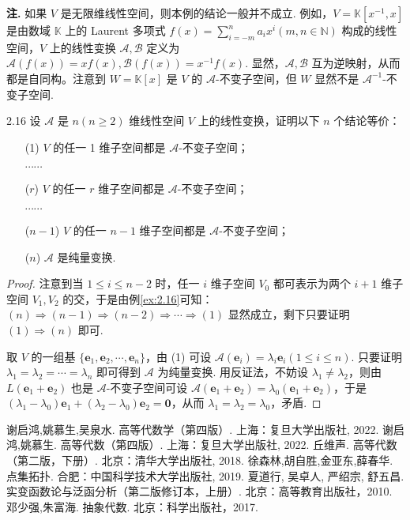 \documentclass[12pt, a4paper,newtx]{ctexart}
\newenvironment{remark}{\dbend\textbf{注. }}{}{}
\begin{document}
\begin{remark}
	如果 $V$ 是无限维线性空间，则本例的结论一般并不成立. 例如，$V = \mathbb{K}[x^{-1}, x]$ 是由数域 $\mathbb{K}$ 上的 Laurent 多项式 $\displaystyle f(x) = \sum_{i=-m}^{n} a_i x^i (m, n \in \mathbb{N})$ 构成的线性空间，$V$ 上的线性变换 $\mathcal{A}, \mathcal B$ 定义为 $\mathcal{A}(f(x)) = xf(x), \mathcal B(f(x)) = x^{-1}f(x)$. 显然，$\mathcal{A}, \mathcal B$ 互为逆映射，从而都是自同构。注意到 $W = \mathbb{K}[x]$ 是 $V$ 的 $\mathcal{A}$-不变子空间，但 $W$ 显然不是 $\mathcal{A}^{-1}$-不变子空间. 
\end{remark}
\begin{example}{}{2.16}
	设 $\mathcal{A}$ 是 $n (n \geqslant 2)$ 维线性空间 $V$ 上的线性变换，证明以下 $n$ 个结论等价：
	\begin{enumerate}
		\item[(1)] $V$ 的任一 1 维子空间都是 $\mathcal{A}$-不变子空间；
		
		$\cdots\cdots$
		\item[($r$)] $V$ 的任一 $r$ 维子空间都是 $\mathcal{A}$-不变子空间；
		
		$\cdots\cdots$
		\item[($n-1$)] $V$ 的任一 $n-1$ 维子空间都是 $\mathcal{A}$-不变子空间；
		\item[($n$)] $\mathcal{A}$ 是纯量变换.
	\end{enumerate}
\end{example}
\begin{proof}
	注意到当 $1 \leqslant i \leqslant n-2$ 时，任一 $i$ 维子空间 $V_0$ 都可表示为两个 $i+1$ 维子空间 $V_1, V_2$ 的交，于是由例\ref{ex:2.16}可知：$(n) \Longrightarrow (n-1) \Longrightarrow (n-2) \Longrightarrow \cdots \Longrightarrow (1)$ 显然成立，剩下只要证明 $(1) \Longrightarrow (n)$ 即可. 
	
	取 $V$ 的一组基 $\{\bm{e}_1, \bm{e}_2, \cdots, \bm{e}_n\}$，由 (1) 可设 $\mathcal{A}(\bm{e}_i) = \lambda_i \bm{e}_i (1 \leqslant i \leqslant n)$. 只要证明 $\lambda_1 = \lambda_2 = \cdots = \lambda_n$ 即可得到 $\mathcal{A}$ 为纯量变换. 用反证法，不妨设 $\lambda_1 \neq \lambda_2$，则由 $L(\bm{e}_1 + \bm{e}_2)$ 也是 $\mathcal{A}$-不变子空间可设 $\mathcal{A}(\bm{e}_1 + \bm{e}_2) = \lambda_0 (\bm{e}_1 + \bm{e}_2)$，于是 $(\lambda_1 - \lambda_0) \bm{e}_1 + (\lambda_2 - \lambda_0) \bm{e}_2 = \mathbf{0}$，从而 $\lambda_1 = \lambda_2 = \lambda_0$，矛盾. 
\end{proof}
\newpage
\begin{thebibliography}{99}  
	
	谢启鸿,姚慕生,吴泉水. 高等代数学（第四版）. 上海：复旦大学出版社, 2022.
	谢启鸿,姚慕生. 高等代数（第四版）. 上海：复旦大学出版社, 2022.
	丘维声. 高等代数（第二版，下册）. 北京：清华大学出版社, 2018. 
	徐森林,胡自胜,金亚东,薛春华. 点集拓扑. 合肥：中国科学技术大学出版社, 2019. 
	夏道行, 吴卓人, 严绍宗, 舒五昌. 实变函数论与泛函分析（第二版修订本，上册）. 北京：高等教育出版社，2010.  
	邓少强,朱富海. 抽象代数. 北京：科学出版社，2017. 
	
\end{thebibliography}
\end{document}
